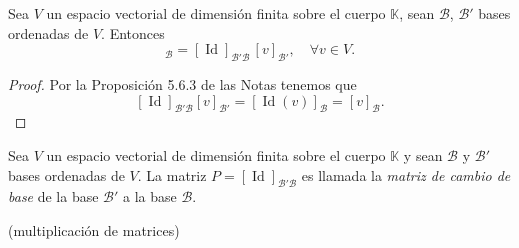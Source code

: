 \documentclass{beamer} %
\newcommand{\Id}{\operatorname{Id}}
\newcommand{\K}{\mathbb K}
\begin{document}
\begin{frame}
    \begin{corolario}\label{cor-cambio-de-base}
        Sea $V$ un espacio vectorial de dimensión finita sobre el cuerpo $\K$, sean $\mathcal B$, $\mathcal B'$  bases ordenadas de $V$. Entonces 
        \begin{equation*}
            [v]_{\mathcal B} = [\Id]_{\mathcal B' \mathcal B}\, [v]_{\mathcal B'}, \quad \forall v \in V.
        \end{equation*}
    \end{corolario}\pause
    \begin{proof}\pause
        Por la Proposición 5.6.3 de las Notas tenemos que 
        $$
        [\Id]_{\mathcal B' \mathcal B}  [v]_{\mathcal B'} = [\Id (v)]_{\mathcal B} = [v]_{\mathcal B}.
        $$
    \end{proof}
    \pause
    \begin{definicion}
        Sea $V$ un espacio vectorial de dimensión finita sobre el cuerpo $\K$ y sean $\mathcal B$ y $\mathcal B'$ bases ordenadas de $V$. La matriz $P =[\Id]_{\mathcal B' \mathcal B}$  es llamada la \textit{matriz de cambio de base}  de la base $\mathcal B'$  a la base $\mathcal B$. 
    \end{definicion}

    

\end{frame}


\begin{frame}

(multiplicación de matrices)
\end{frame}
\end{document}
